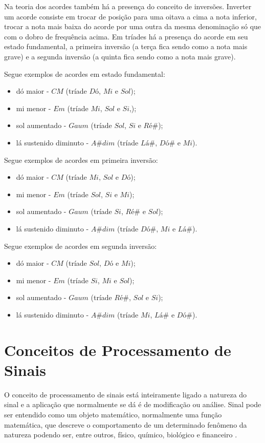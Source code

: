 Na teoria dos acordes também há a presença do conceito de inversões. Inverter um acorde consiste em trocar de posição para uma oitava a cima a nota inferior, trocar a nota mais baixa do acorde por uma outra da mesma denominação só que com o dobro de frequência acima. Em tríades há a presença do acorde em seu estado fundamental, a primeira inversão (a terça fica sendo como a nota mais grave) e a segunda inversão (a quinta fica sendo como a nota mais grave).

Segue exemplos de acordes em estado fundamental:
\begin{itemize}
	\item dó maior - $CM$ (tríade $Dó$, $Mi$ e $Sol$);
	\item mi menor - $Em$ (tríade  $Mi$, $Sol$ e $Si$,);
	\item sol aumentado - $Gaum$ (tríade  $Sol$, $Si$ e $Ré\#$);
	\item lá sustenido diminuto - $A\#dim$ (tríade $Lá\#$, $Dó\#$ e $Mi$).
\end{itemize}

Segue exemplos de acordes em primeira inversão:
\begin{itemize}
	\item dó maior - $CM$ (tríade $Mi$, $Sol$ e $Dó$);
	\item mi menor - $Em$ (tríade $Sol$, $Si$ e $Mi$);
	\item sol aumentado - $Gaum$ (tríade $Si$, $Ré\#$ e $Sol$);
	\item lá sustenido diminuto - $A\#dim$ (tríade $Dó\#$, $Mi$ e $Lá\#$).
\end{itemize}

Segue exemplos de acordes em segunda inversão:
\begin{itemize}
	\item dó maior - $CM$ (tríade $Sol$, $Dó$ e $Mi$);
	\item mi menor - $Em$ (tríade $Si$, $Mi$ e $Sol$);
	\item sol aumentado - $Gaum$ (tríade $Ré\#$, $Sol$ e $Si$);
	\item lá sustenido diminuto - $A\#dim$ (tríade $Mi$, $Lá\#$ e $Dó\#$).
\end{itemize}

\section{Conceitos de Processamento de Sinais}
\label{sec:conceitosprocessamentosinais}
O conceito de processamento de sinais está inteiramente ligado a natureza do sinal e a aplicação que normalmente se dá é de modificação ou análise. Sinal pode ser entendido como um objeto matemático, normalmente uma função matemática, que descreve o comportamento de um determinado fenômeno da natureza podendo ser, entre outros, físico, químico, biológico e financeiro \cite{oppenheim}.

